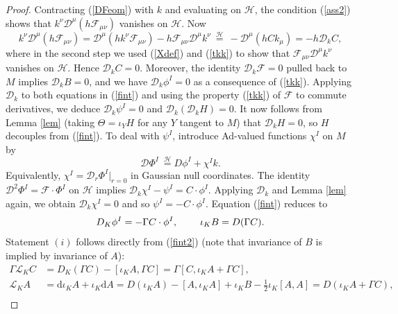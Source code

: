 \documentclass[11pt, reqno]{amsart}
\theoremstyle{plain}
\theoremstyle{definition}
\numberwithin{equation}{section}
\begin{document}
\begin{proof}
Contracting (\ref{DFeom}) with $k$ and evaluating on $\mathcal{H}$, the condition (\ref{ass2}) shows that $k^\nu\mathcal{D}^\mu(h\mathcal{F}_{\mu\nu})$ vanishes on $\mathcal{H}$. Now
\begin{equation*}
    k^\nu\mathcal{D}^\mu(h\mathcal{F}_{\mu\nu}) = \mathcal{D}^\mu(hk^\nu\mathcal{F}_{\mu\nu}) - h\mathcal{F}_{\mu\nu}\mathcal{D}^\mu k^\nu \:\overset{\mathcal{H}}{=}\: -\mathcal{D}^\mu(hCk_\mu) = -h\mathcal{D}_kC,
\end{equation*}
where in the second step we used (\ref{Xdef}) and (\ref{tkk}) to show that $\mathcal{F}_{\mu\nu}\mathcal{D}^\mu k^\nu$ vanishes on $\mathcal{H}$.
Hence $\mathcal{D}_kC = 0$. Moreover, the identity $\mathcal{D}_k\mathcal{F} = 0$ pulled back to $M$ implies $\mathcal{D}_k B = 0$, and we have $\mathcal{D}_k\phi^I = 0$ as a consequence of (\ref{tkk}). Applying $\mathcal{D}_k$ to both equations in (\ref{fint}) and using the property (\ref{tkk}) of $\mathcal{F}$ to commute derivatives, we deduce $\mathcal{D}_k\psi^I = 0$ and $\mathcal{D}_k(\mathcal{D}_k H) = 0$. It now follows from Lemma \ref{lem} (taking $\Theta = \iota_Y H$ for any $Y$ tangent to $M$) that $\mathcal{D}_k H = 0$, so $H$ decouples from (\ref{fint}). To deal with $\psi^I$, introduce Ad-valued functions $\chi^I$ on $M$ by
\begin{equation*}
    \mathcal{D}\Phi^I \:\overset{\mathcal{H}}{=} D\phi^I +\chi^Ik.
\end{equation*}
Equivalently, $\chi^I = \mathcal{D}_r\Phi^I \vert_{r = 0}$ in Gaussian null coordinates. The identity $\mathcal{D}^2 \Phi^I = \mathcal{F} \cdot \Phi^I$ on $\mathcal{H}$ implies $\mathcal{D}_k \chi^I - \psi^I = C \cdot \phi^I.$
Applying $\mathcal{D}_k$ and Lemma \ref{lem} again, we obtain $\mathcal{D}_k \chi^I = 0$ and so $\psi^I = - C \cdot \phi^I$. Equation (\ref{fint}) reduces to 
\begin{equation} \label{fint2}
    D_K \phi^I = -\Gamma C \cdot \phi^I, \hspace{.8cm} \iota_K B = D(\Gamma C).
\end{equation}
Statement $(i)$ follows directly from (\ref{fint2}) (note that invariance of $B$ is implied by invariance of $A$):
\begin{align*}
    \Gamma\mathcal{L}_K C &= D_K(\Gamma C) - [\iota_KA,\Gamma C] = \Gamma[C, \iota_KA+\Gamma C],\\
    \mathcal{L}_K A &= \text{d}\iota_KA + \iota_K\text{d}A = D(\iota_KA) - [A,\iota_KA] + \iota_K B - \frac 12\iota_K [A,A] = D(\iota_KA + \Gamma C), \\

\end{align*}
\end{proof}
\end{document}
